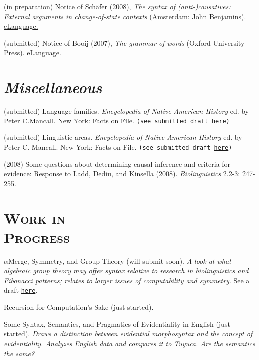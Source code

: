 \documentclass{resume}
\begin{document}
\begin{resume}
(in preparation) Notice of Sch\"afer (2008), \emph{The syntax of (anti-)causatives: External arguments in change-of-state contexts} (Amsterdam: John Benjamins). \href{http://www.elanguage.net/home.php}{eLanguage.}


(submitted) Notice of Booij (2007), \emph{The grammar of words} (Oxford University Press). \href{http://www.elanguage.net/home.php}{eLanguage.}


\section{{\sl Miscellaneous}}
(submitted) Language families. \emph{Encyclopedia of Native American History} ed. by \href{http://college.usc.edu/faculty/faculty1003494.html}{Peter C.Mancall}. New York: Facts on File. \texttt{(see submitted draft \href{http://sites.google.com/site/bowleslinguistics/Home/research/teaching-1/publications}{here})}

(submitted) Linguistic areas. \emph{Encyclopedia of Native American History} ed. by Peter C. Mancall. New York: Facts on File. \texttt{(see submitted draft \href{http://sites.google.com/site/bowleslinguistics/Home/research/teaching-1/publications}{here})}

(2008) Some questions about determining causal inference and criteria for evidence:
Response to Ladd, Dediu, and Kinsella (2008). \emph{\href{http://www.biolinguistics.eu.}{Biolinguistics}} 2.2-3: 247-255.

\section{\textsc{Work in\\ Progress}}

$\alpha$Merge, Symmetry, and Group Theory (will submit soon). \textsl{A look at what algebraic group theory may offer syntax relative to research in biolinguistics and Fibonacci patterns; relates to larger issues of computability and symmetry}. See a draft \href{http://sites.google.com/site/bowleslinguistics/Home/research}{\texttt{here}}.%

Recursion for Computation's Sake (just started). %

Some Syntax, Semantics, and Pragmatics of Evidentiality in English (just started). \textsl{Draws a distinction between evidential morphosyntax and the concept of evidentiality. Analyzes English data and compares it to Tuyuca. Are the semantics the same?} %


\end{resume}
\end{document}
